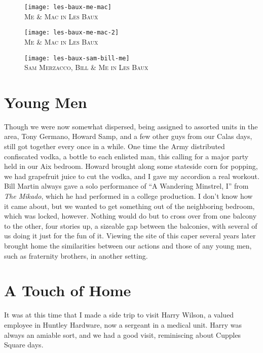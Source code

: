 \documentclass[../m3y]{subfiles}
\begin{document}
\begin{figure}[h]
\centering
\texttt{[image: les-baux-me-mac]}\\
\medskip
{\newtimes\textsc{Me \& Mac in Les Baux}}
\end{figure}

\begin{figure}[h]
\centering
\texttt{[image: les-baux-me-mac-2]}\\
\medskip
{\newtimes\textsc{Me \& Mac in Les Baux}}
\end{figure}

\begin{figure}[h]
\centering
\texttt{[image: les-baux-sam-bill-me]}\\
\medskip
{\newtimes\textsc{Sam Merzacco, Bill \& Me in Les Baux}}
\end{figure}

\section{Young Men}
Though we were now somewhat dispersed, being assigned to assorted units in the area, Tony Germano, Howard Samp, and a few other guys from our Calas days, still got together every once in a while. One time the Army distributed confiscated vodka, a bottle to each enlisted man, this calling for a major party held in our Aix bedroom. Howard brought along some stateside corn for popping, we had grapefruit juice to cut the vodka, and I gave my accordion a real workout. Bill Martin always gave a solo performance of ``A Wandering Minstrel, I'' from \emph{The Mikado}, which he had performed in a college production. I don't know how it came about, but we wanted to get something out of the neighboring bedroom, which was locked, however. Nothing would do but to cross over from one balcony to the other, four stories up, a sizeable gap between the balconies, with several of us doing it just for the fun of it. Viewing the site of this caper several years later brought home the similarities between our actions and those of any young men, such as fraternity brothers, in another setting.

\section{A Touch of Home}
It was at this time that I made a side trip to visit Harry Wilson, a valued employee in Huntley Hardware, now a sergeant in a medical unit. Harry was always an amiable sort, and we had a good visit, reminiscing about Cupples Square days.
\end{document}

